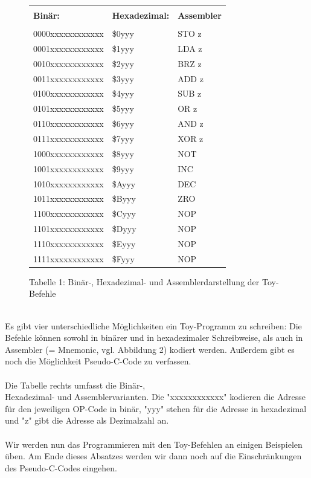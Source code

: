 \documentclass{article}
\begin{document}
\begin{figure}
\centering
\begin{tabular}{|p{3cm}|p{3cm}|p{3cm}|}
    \hline
    & & \\
    \textbf{Binär:} & \textbf{Hexadezimal:} & \textbf{Assembler}\\
    & & \\
    \hline
    0000xxxxxxxxxxxx & \$0yyy & STO z \\
    0001xxxxxxxxxxxx & \$1yyy & LDA z \\
    0010xxxxxxxxxxxx & \$2yyy & BRZ z \\
    0011xxxxxxxxxxxx & \$3yyy & ADD z \\
    0100xxxxxxxxxxxx & \$4yyy & SUB z \\
    0101xxxxxxxxxxxx & \$5yyy & OR z \\
    0110xxxxxxxxxxxx & \$6yyy & AND z \\
    0111xxxxxxxxxxxx & \$7yyy & XOR z \\
    1000xxxxxxxxxxxx & \$8yyy & NOT \\
    1001xxxxxxxxxxxx & \$9yyy & INC \\
    1010xxxxxxxxxxxx & \$Ayyy & DEC \\
    1011xxxxxxxxxxxx & \$Byyy & ZRO \\
    1100xxxxxxxxxxxx & \$Cyyy & NOP \\
    1101xxxxxxxxxxxx & \$Dyyy & NOP \\
    1110xxxxxxxxxxxx & \$Eyyy & NOP \\
    1111xxxxxxxxxxxx & \$Fyyy & NOP\\
    \hline
\end{tabular}
\centering \caption*{Tabelle 1: Binär-, Hexadezimal- und Assemblerdarstellung der Toy-Befehle}
\end{figure}
\hspace{20cm}\\Es gibt vier unterschiedliche Möglichkeiten ein Toy-Programm zu schreiben:
Die Befehle können sowohl in binärer und in hexadezimaler Schreibweise, als
auch in Assembler (= Mnemonic, vgl. Abbildung 2) kodiert werden. Außerdem gibt es noch die Möglichkeit
Pseudo-C-Code zu verfassen. \\\\Die Tabelle rechts umfasst die Binär-,\\ Hexadezimal-
und Assemblervarianten. Die "xxxxxxxxxxxx" kodieren die Adresse für den
jeweiligen OP-Code in binär, "yyy" stehen für die Adresse in hexadezimal und
"z" gibt die Adresse als Dezimalzahl an.\\\\ Wir werden nun das Programmieren mit den
Toy-Befehlen an einigen Beispielen üben. Am Ende dieses Absatzes werden wir dann noch auf die
Einschränkungen des Pseudo-C-Codes eingehen.\\\\\\
\end{document}
